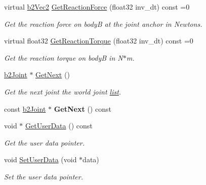 \begin{DoxyCompactItemize}
\mbox{\label{classb2Joint_a7e0eddefb9b69ad050b8ef6425838a74}} 
virtual \hyperlink{structb2Vec2}{b2\+Vec2} \hyperlink{classb2Joint_a7e0eddefb9b69ad050b8ef6425838a74}{Get\+Reaction\+Force} (float32 inv\+\_\+dt) const =0
\begin{DoxyCompactList}\small\item\em Get the reaction force on bodyB at the joint anchor in Newtons. \end{DoxyCompactList}\item 
\mbox{\label{classb2Joint_ae355e441c2aa842777dc04e24f15ced0}} 
virtual float32 \hyperlink{classb2Joint_ae355e441c2aa842777dc04e24f15ced0}{Get\+Reaction\+Torque} (float32 inv\+\_\+dt) const =0
\begin{DoxyCompactList}\small\item\em Get the reaction torque on bodyB in N$\ast$m. \end{DoxyCompactList}\item 
\mbox{\label{classb2Joint_a1a0e2137b631010750c728cb4e276e5d}} 
\hyperlink{classb2Joint}{b2\+Joint} $\ast$ \hyperlink{classb2Joint_a1a0e2137b631010750c728cb4e276e5d}{Get\+Next} ()
\begin{DoxyCompactList}\small\item\em Get the next joint the world joint \hyperlink{protocollist-p}{list}. \end{DoxyCompactList}\item 
\mbox{\label{classb2Joint_aac18301414d6ca0a20aefb471c709e78}} 
const \hyperlink{classb2Joint}{b2\+Joint} $\ast$ {\bfseries Get\+Next} () const
\item 
\mbox{\label{classb2Joint_a798c593c7a4958d408bca10f3b3788f9}} 
void $\ast$ \hyperlink{classb2Joint_a798c593c7a4958d408bca10f3b3788f9}{Get\+User\+Data} () const
\begin{DoxyCompactList}\small\item\em Get the user data pointer. \end{DoxyCompactList}\item 
\mbox{\label{classb2Joint_a492f2d02496437572aaec6013ebdc1c8}} 
void \hyperlink{classb2Joint_a492f2d02496437572aaec6013ebdc1c8}{Set\+User\+Data} (void $\ast$data)
\begin{DoxyCompactList}\small\item\em Set the user data pointer. \end{DoxyCompactList}\item 

\end{DoxyCompactItemize}
